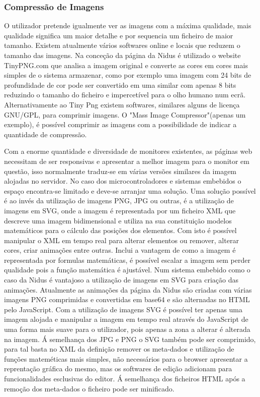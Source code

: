 \subsubsection{Compressão de Imagens}
\par

O utilizador pretende igualmente ver as imagens com a máxima qualidade, mais qualidade significa um maior detalhe e por sequencia um ficheiro de maior tamanho. Existem atualmente vários softwares online e locais que reduzem o tamanho das imagens. Na conceção da página da Nidus é utilizado o website TinyPNG.com que analisa a imagem original e converte as cores em cores mais simples de o sistema armazenar, como por exemplo uma imagem com 24 bits de profundidade de cor pode ser convertido em uma similar com apenas 8 bits reduzindo o tamanho do ficheiro e impercetível para o olho humano num ecrã\cite{Hilles2019}. Alternativamente ao Tiny Png existem softwares, similares alguns de licença GNU/GPL, para comprimir imagens. O "Mass Image Compressor"\cite{Mass_Image_Compressor}(apenas um exemplo), é possível comprimir as imagens com a possibilidade de indicar a quantidade de compressão.
\par
Com a enorme quantidade e diversidade de monitores existentes, as páginas web necessitam de ser responsivas e apresentar a melhor imagem para o monitor em questão, isso normalmente traduz-se em várias versões similares da imagem alojadas no servidor. No caso dos microcontroladores e sistemas embebidos o espaço encontra-se limitado e deve-se arranjar uma solução. Uma solução possível é ao invés da utilização de imagens PNG, JPG ou outras, é a utilização de imagens em SVG, onde a imagem é representada por um ficheiro XML que descreve uma imagem bidimensional e utiliza na sua constituição modelos matemáticos para o cálculo das posições dos elementos. Com isto é possível manipular o XML em tempo real para alterar elementos ou remover, alterar cores, criar animações entre outras. Inclui a vantagem de como a imagem é representada por formulas matemáticas, é possível escalar a imagem sem perder qualidade pois a função matemática é ajustável. Num sistema embebido como o caso da Nidus é vantajoso a utilização de imagens em SVG para criação das animações. Atualmente as animações da página da Nidus são criadas com várias imagens PNG comprimidas e convertidas em base64 e são alternadas no HTML pelo JavaScript. Com a utilização de imagens SVG é possível ter apenas uma imagem alojada e manipular a imagem em tempo real através do JavaScript de uma forma mais suave para o utilizador, pois apenas a zona a alterar é alterada na imagem.
Á semelhança dos JPG e PNG o SVG também pode ser comprimido, para tal basta no XML da definição remover os meta-dados  e utilização de funções mateméticas mais simples, não necessários para o browser apresentar a reprentação gráfica do mesmo, mas os softwares de edição adicionam para funcionalidades esclusivas do editor. Á semelhança dos ficheiros HTML após a remoção dos meta-dados o ficheiro pode ser minificado.

